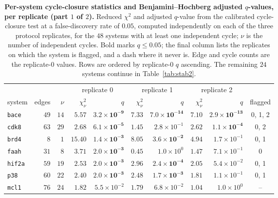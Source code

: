 \begin{table}[tp]\centering
\caption{\textbf{Per-system cycle-closure statistics and Benjamini--Hochberg adjusted
$q$-values, per replicate (part $1$ of $2$).} Reduced $\chi^2$ and adjusted $q$-value from the
calibrated cycle-closure test at a false-discovery rate of $0.05$, computed independently on each
of the three protocol replicates, for the $48$ systems with at least one independent cycle;
$\nu$ is the number of independent cycles. Bold marks $q\le0.05$; the final column lists the
replicates on which the system is flagged, and a dash where it never is. Edge and cycle counts are
the replicate-0 values. Rows are ordered by replicate-0 $q$ ascending. The remaining $24$ systems
continue in Table~\ref{tab:stab2}.}
\label{tab:stab}
\footnotesize
\setlength{\tabcolsep}{3.4pt}
\begin{tabular}{@{}lrrrrrrrrc@{}}
\toprule
& & & \multicolumn{2}{c}{replicate 0} & \multicolumn{2}{c}{replicate 1} &
\multicolumn{2}{c}{replicate 2} & \\
\cmidrule(lr){4-5}\cmidrule(lr){6-7}\cmidrule(lr){8-9}
system & edges & $\nu$ & $\chi^2_\nu$ & $q$ & $\chi^2_\nu$ & $q$ & $\chi^2_\nu$ & $q$ &
flagged \\
\midrule
\texttt{bace} & $49$ & $14$ & $\mathbf{5.57}$ & $\mathbf{3.2{\times}10^{-9}}$ & $\mathbf{7.33}$ & $\mathbf{7.0{\times}10^{-14}}$ & $\mathbf{7.10}$ & $\mathbf{2.9{\times}10^{-13}}$ & 0, 1, 2 \\
\texttt{cdk8} & $63$ & $29$ & $\mathbf{2.68}$ & $\mathbf{6.1{\times}10^{-5}}$ & $1.45$ & $2.8{\times}10^{-1}$ & $\mathbf{2.62}$ & $\mathbf{1.1{\times}10^{-4}}$ & 0, 2 \\
\texttt{brd4} & $8$ & $1$ & $\mathbf{15.40}$ & $\mathbf{1.4{\times}10^{-3}}$ & $\mathbf{8.05}$ & $\mathbf{3.6{\times}10^{-2}}$ & $4.94$ & $1.7{\times}10^{-1}$ & 0, 1 \\
\texttt{faah} & $31$ & $8$ & $\mathbf{3.71}$ & $\mathbf{2.0{\times}10^{-3}}$ & $0.45$ & $1.0{\times}10^{0}$ & $1.47$ & $7.1{\times}10^{-1}$ & 0 \\
\texttt{hif2a} & $59$ & $19$ & $\mathbf{2.53}$ & $\mathbf{2.0{\times}10^{-3}}$ & $\mathbf{2.96}$ & $\mathbf{2.4{\times}10^{-4}}$ & $2.05$ & $5.4{\times}10^{-2}$ & 0, 1 \\
\texttt{p38} & $60$ & $22$ & $\mathbf{2.40}$ & $\mathbf{2.0{\times}10^{-3}}$ & $\mathbf{2.48}$ & $\mathbf{1.7{\times}10^{-3}}$ & $1.81$ & $1.1{\times}10^{-1}$ & 0, 1 \\
\texttt{mcl1} & $76$ & $24$ & $1.82$ & $5.5{\times}10^{-2}$ & $1.79$ & $6.8{\times}10^{-2}$ & $1.04$ & $1.0{\times}10^{0}$ & -- \\

\end{tabular}
\end{table}
